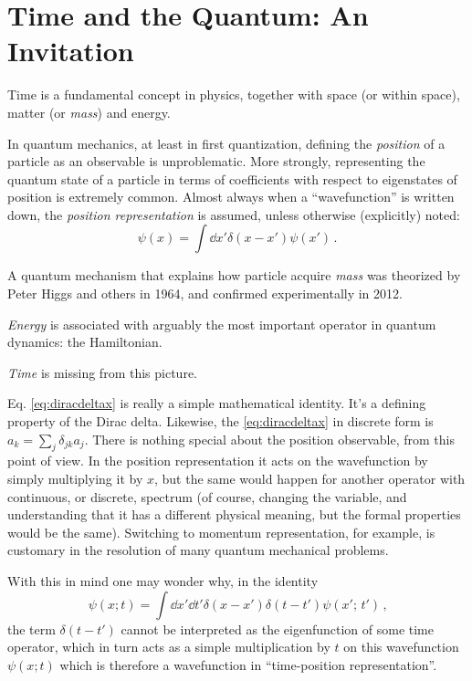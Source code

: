 \section{Time and the Quantum: An Invitation}

Time is a fundamental concept in physics, together with space (or  within space),
matter (or \emph{mass}) and energy.

In quantum mechanics, at least in first quantization, defining the \emph{position} of a particle as
an observable is unproblematic. More strongly, representing the quantum state of a particle
in terms of coefficients with respect to eigenstates of position is extremely common.
Almost always when a ``wavefunction'' is written down, the \emph{position representation}
is assumed, unless otherwise (explicitly) noted:
\begin{equation}\label{eq:diracdeltax}
  \psi(x) = \int \dd{x'} \delta(x-x') \psi(x') \,\text{.}
\end{equation}

A quantum mechanism that explains how particle acquire \emph{mass} was theorized by
Peter Higgs and others in 1964, and confirmed experimentally in 2012.

\emph{Energy} is associated with arguably the most important operator in quantum dynamics: the Hamiltonian.

\emph{Time} is missing from this picture.

Eq. \eqref{eq:diracdeltax} is really a simple mathematical identity.
It's a defining property of the Dirac delta.
Likewise, the \eqref{eq:diracdeltax} in discrete form is $a_k = \sum_j \delta_{jk} a_j$.
There is nothing special about the position observable, from this point of view.
In the position representation it acts on the wavefunction by simply
multiplying it by $x$,
but the same would happen for another operator with continuous, or discrete, spectrum
(of course, changing the variable, and understanding that it has a different physical meaning, but the formal properties would be the same).
Switching to momentum representation, for example, is customary in the resolution of many quantum mechanical problems.

With this in mind one may wonder why, in the identity
\begin{equation}\label{eq:diracdeltaxt}
  \psi(x; t) = \int \dd{x'}\dd{t'} \delta(x-x')\delta(t-t') \psi(x';\, t') \,\text{,}
\end{equation}
the term $\delta(t-t')$ cannot be interpreted as the eigenfunction of some time operator,
which in turn acts as a simple multiplication by $t$ on this
wavefunction $\psi(x; t)$ which is therefore a wavefunction in ``time-position representation''.
